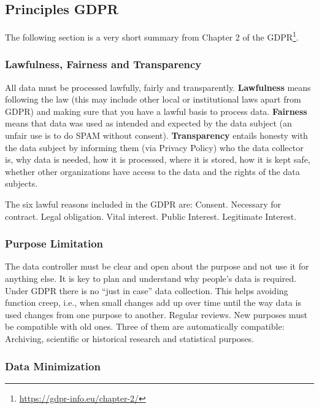 \documentclass[
  12pt,
]{book}
\DeclareRobustCommand{\href}[2]{#2\footnote{\url{#1}}}
\begin{document}
\subsection{Principles GDPR}\label{principles-gdpr}

The following section is a very short summary from \href{https://gdpr-info.eu/chapter-2/}{Chapter 2 of the GDPR}.

\subsubsection{Lawfulness, Fairness and Transparency}\label{lawfulness-fairness-and-transparency}

All data must be processed lawfully, fairly and transparently. \textbf{Lawfulness} means following the law (this may include other local or institutional laws apart from GDPR) and making sure that you have a lawful basis to process data. \textbf{Fairness} means that data was used as intended and expected by the data subject (an unfair use is to do SPAM without consent). \textbf{Transparency} entails honesty with the data subject by informing them (via Privacy Policy) who the data collector is, why data is needed, how it is processed, where it is stored, how it is kept safe, whether other organizations have access to the data and the rights of the data subjects.

The six lawful reasons included in the GDPR are: Consent. Necessary for contract. Legal obligation. Vital interest. Public Interest. Legitimate Interest.

\subsubsection{Purpose Limitation}\label{purpose-limitation}

The data controller must be clear and open about the purpose and not use it for anything else. It is key to plan and understand why people's data is required. Under GDPR there is no ``just in case'' data collection. This helps avoiding function creep, i.e., when small changes add up over time until the way data is used changes from one purpose to another. Regular reviews. New purposes must be compatible with old ones. Three of them are automatically compatible: Archiving, scientific or historical research and statistical purposes.

\subsubsection{Data Minimization}\label{data-minimization}
\end{document}
